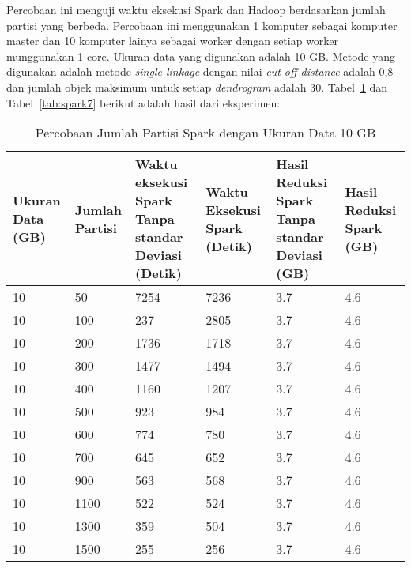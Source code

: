 


Percobaan ini menguji waktu eksekusi Spark dan Hadoop berdasarkan jumlah partisi yang berbeda. Percobaan ini menggunakan 1 komputer sebagai komputer master dan 10 komputer lainya sebagai worker dengan setiap worker munggunakan 1 core. Ukuran data yang digunakan adalah 10 GB. Metode yang digunakan adalah metode \textit{single linkage} dengan nilai \textit{cut-off distance} adalah 0,8 dan jumlah objek maksimum untuk setiap \textit{dendrogram} adalah 30. Tabel~\ref{tab:spark6} dan Tabel~\ref{tab:spark7} berikut adalah hasil dari eksperimen:

\begin{table}[H] 
	\centering 
	\caption{Percobaan Jumlah Partisi Spark dengan Ukuran Data 10 GB}
	\label{tab:spark6}
	\begin{tabular}{|p{1cm}|p{1cm}|p{3cm}|p{3cm}|p{3cm}|p{3cm}|}
\hline
Ukuran Data (GB) & Jumlah Partisi &  Waktu eksekusi Spark Tanpa standar Deviasi (Detik) & Waktu Eksekusi Spark (Detik) & Hasil Reduksi Spark Tanpa standar Deviasi (GB) & Hasil Reduksi Spark (GB)  \\ 
\hline
10 & 50 & 7254 & 7236 & 3.7 & 4.6 \\
\hline
10 & 100 & 237 & 2805 &  3.7 & 4.6 \\
\hline
10 & 200 & 1736 & 1718 & 3.7 & 4.6 \\
\hline
10 & 300 & 1477 & 1494 & 3.7 & 4.6 \\
\hline
10 & 400 & 1160 & 1207 & 3.7 & 4.6 \\
\hline
10 & 500 & 923 & 984 &  3.7 & 4.6 \\
\hline
10 & 600 & 774 & 780 & 3.7 & 4.6 \\
\hline
10 & 700 & 645 & 652 & 3.7 & 4.6 \\
\hline
10 & 900 & 563 & 568 & 3.7 & 4.6 \\
\hline
10 & 1100 & 522 & 524 & 3.7 & 4.6 \\
\hline
10 & 1300 & 359 & 504 & 3.7 & 4.6 \\
\hline
10 & 1500 & 255 & 256 & 3.7 & 4.6 \\
\hline


\hline

	\end{tabular} 
\end{table}



